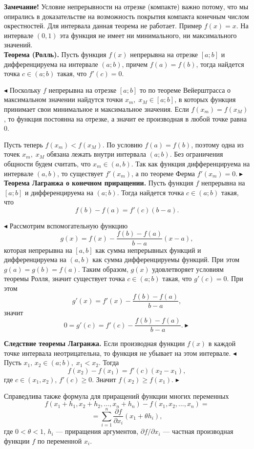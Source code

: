 \documentclass[12pt]{article}
\begin{document}
\textbf{Замечание!} Условие непрерывности на отрезке (компакте) важно потому, что мы опирались в доказательстве на возможность покрытия компакта конечным числом окрестностей. Для интервала данная теорема не работает. Пример $f(x) = x$. На интервале $(0,1)$ эта функция не имеет ни минимального, ни максимального значений.  \\


\textbf{Теорема (Ролль).} Пусть функция $f(x)$ непрерывна на отрезке $[a;b]$ и дифференцируема на интервале $(a;b)$, причем $f(a) = f(b)$, тогда найдется точка $c \in (a;b)$ такая, что $f'(c) = 0$.

$\blacktriangleleft$ Поскольку $f$ непрерывна на отрезке $[a;b]$ то по теореме Вейерштрасса о максимальном значении найдутся точки $x_m, \; x_M \in [a;b]$, в которых функция принимает свои минимальное и максимальное значения. Если $f(x_m) = f(x_M)$, то функция постоянна на отрезке, а значит ее производная в любой точке равна 0.

Пусть теперь $f(x_m) < f(x_M)$. По условию $f(a) = f(b)$, поэтому одна из точек $x_m, \; x_M$ обязана лежать внутри интервала $(a;b)$. Без ограничения общности будем считать, что $x_m \in (a,b)$. Так как функция дифференцируема на интервале $(a,b)$, то существует $f'(x_m)$, а по теореме Ферма $f'(x_m) = 0. \blacktriangleright$ \\

\textbf{Теорема Лагранжа о конечном приращении.} Пусть функция $f$ непрерывна на $[a;b]$ и дифференцируема на $(a;b)$. Тогда найдется точка $c \in (a;b)$ такая, что
$$
	f(b) - f(a) = f'(c)(b-a).
$$

$\blacktriangleleft$ Рассмотрим вспомогательную функцию 
$$
	g(x) = f(x) - \frac{f(b) - f(a)}{b-a}(x-a),
$$
которая непрерывна на $[a,b]$ как сумма непрерывных функций и дифференцируема на $(a,b)$ как сумма дифференцируемы функций. При этом $g(a) = g(b) = f(a)$. Таким образом, $g(x)$ удовлетворяет условиям теоремы Ролля, значит существует точка $c \in (a;b)$ такая, что $g'(c) = 0$. При этом
$$
g'(x) = f'(x) - \frac{f(b) - f(a)}{b-a},
$$
значит 
$$
0 = g'(c) = f'(c) - \frac{f(b) - f(a)}{b-a}. \blacktriangleright
$$

\textbf{Следствие теоремы Лагранжа.} Если производная функции $f(x)$ в каждой точке интервала неотрицательна, то функция не убывает на этом интервале. $\blacktriangleleft$ Пусть $x_1, \, x_2 \in (a;b), \; x_1 < x_2$. Тогда 
$$	
f(x_2) - f(x_1) = f'(c)(x_2 - x_1),
$$
где $c \in (x_1, x_2)$, $f'(c) \geq 0$. Значит $f(x_2) \geq f(x_1)$.
$\blacktriangleright$


Справедлива также формула для приращений функции многих переменных
$$
f(x_1 + h_1, x_2 + h_2, ..., x_n + h_n) - f(x_1, x_2, ..., x_n) =
$$
$$
 = \sum_{i = 1}^n\frac{\partial f}{\partial x_i}(x_1 + \theta h_i),
$$
где $0 < \theta < 1$, $h_i$ --- приращения аргументов, $\partial f/ \partial x_i$ --- частная производная функции $f$ по переменной $x_i$. 
	
	
\end{document}
